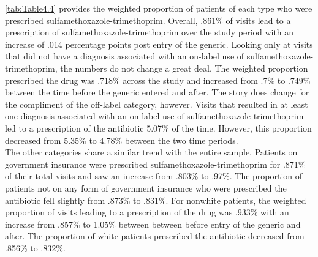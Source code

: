 
\autoref{tab:Table4.4} provides the weighted proportion of patients of each type who were prescribed sulfamethoxazole-trimethoprim. Overall, .861\% of visits lead to a prescription of sulfamethoxazole-trimethoprim over the study period with an increase of .014 percentage points post entry of the generic. Looking only at visits that did not have a diagnosis associated with an on-label use of sulfamethoxazole-trimethoprim, the numbers do not change a great deal. The weighted proportion prescribed the drug was .718\% across the study and increased from .7\% to .749\% between the time before the generic entered and after. The story does change for the compliment of the off-label category, however. Visits that resulted in at least one diagnosis associated with an on-label use of sulfamethoxazole-trimethoprim led to a prescription of the antibiotic 5.07\% of the time. However, this proportion decreased from 5.35\% to 4.78\% between the two time periods.\\
\indent The other categories share a similar trend with the entire sample. Patients on government insurance were prescribed sulfamethoxazole-trimethoprim for .871\% of their total visits and saw an increase from .803\% to .97\%. The proportion of patients not on any form of government insurance who were prescribed the antibiotic fell slightly from .873\% to .831\%. For nonwhite patients, the weighted proportion of visits leading to a prescription of the drug was .933\% with an increase from .857\% to 1.05\% between between before entry of the generic and after. The proportion of white patients prescribed the antibiotic decreased from .856\% to .832\%. 

